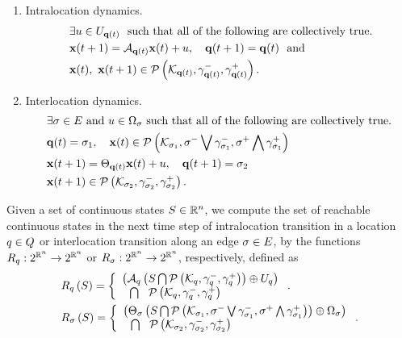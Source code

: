 \begin{enumerate}
\item Intralocation dynamics.
\begin{align}~\label{eqn:intralocation}
\begin{split}
& \exists u\in U_{{\bf q}(t)}~~\text{such that all of
    the following  are collectively true.}\\
& {\bf x}(t+1) = \mathcal{A}_{{\bf q}(t)}{\bf x}(t)+u,~~~{\bf q}(t+1) = {\bf q}(t)~~
\text{and}\\
& {\bf x}(t),~{\bf x}(t+1)\in\mathcal{P}\left(\mathcal{K}_{{\bf q}(t)},\gamma^-_{{\bf q}(t)},\gamma^+_{{\bf q}(t)}\right).
\end{split}
\end{align}
\item Interlocation dynamics.
\begin{align} 
\begin{split}
& \exists \sigma\in E~\text{and}~u\in\Omega_{\sigma}~\text{such
that all of the following are collectively true.}\\
& {\bf q}(t)=\sigma_{1},~~~{\bf x}(t)\in\mathcal{P}\left(\mathcal{K}_{\sigma_{1}},\sigma^-\bigvee\gamma^-_{\sigma_{1}},\sigma^+\bigwedge\gamma^+_{\sigma_{1}}\right) \\
& {\bf x}(t+1) = \Theta_{{\bf q}(t)}{\bf x}(t)+u,~~~{\bf q}(t+1)
= \sigma_{2}\\
& {\bf x}(t+1)\in \mathcal{P}\left(\mathcal{K}_{\sigma_{2}},\gamma^-_{\sigma_{2}},\gamma^+_{\sigma_{2}}\right).
\end{split}
\end{align}
\end{enumerate}

Given a set of continuous states $S\in\mathbb{R}^n$, we compute the set
of reachable continuous states in the next time step of intralocation transition
in a location $q\in Q$ or interlocation transition along
an edge $\sigma\in E$, by the functions
$R_{q}:2^{\mathbb{R}^n}\rightarrow 2^{\mathbb{R}^n}$ or
$R_{\sigma}:2^{\mathbb{R}^n}\rightarrow 2^{\mathbb{R}^n}$,
respectively, defined as
\begin{align*}
&R_{q}\left(S\right) = \left\{\begin{array}{l}{\left(\mathcal{A}_{q}\left(S\bigcap\mathcal{P}\left(\mathcal{K}_{q},\gamma^-_{q},\gamma^+_{q}\right)\right)\oplus
U_q\right)}\\{~~\bigcap~~\mathcal{P}\left(\mathcal{K}_{q},\gamma^-_{q},\gamma^+_{q}\right)} \end{array}\right..\\
&R_{\sigma}\left(S\right) =  \left\{\begin{array}{l}{\left(\Theta_\sigma\left(S\bigcap
\mathcal{P}\left(\mathcal{K}_{\sigma_{1}},\sigma^-\bigvee\gamma^-_{\sigma_{1}},\sigma^+\bigwedge\gamma^+_{\sigma_{1}}\right)\right)\oplus\Omega_\sigma\right)}\\{~~\bigcap~~\mathcal{P}\left(\mathcal{K}_{\sigma_{2}},\gamma^-_{\sigma_{2}},\gamma^+_{\sigma_{2}}\right)} \end{array}\right..
\end{align*}

